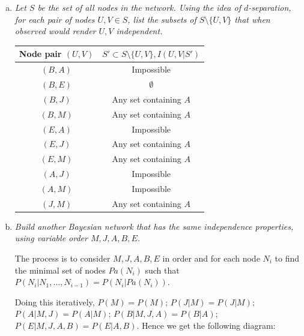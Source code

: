 \documentclass{article}
\begin{document}
\begin{enumerate}[(a)]
\item \textit{Let $S$ be the set of all nodes in the network. Using
  the idea of $d$-separation, for each pair of nodes $U,V\in S$, list
  the subsets of $S\setminus \{U,V\}$ that when observed would render
  $U,V$ independent.}

  \begin{tabular}{|c|c|}
  \hline
  Node pair $(U,V)$ & $S'\subset S\setminus \{U,V\},I(U,V|S')$ \\
  \hline
  $(B, A)$ & Impossible \\
  $(B, E)$ & $\emptyset$ \\
  $(B, J)$ & Any set containing $A$ \\
  $(B, M)$ & Any set containing $A$ \\
  $(E, A)$ & Impossible \\
  $(E, J)$ & Any set containing $A$ \\
  $(E, M)$ & Any set containing $A$ \\
  $(A, J)$ & Impossible \\
  $(A, M)$ & Impossible \\
  $(J, M)$ & Any set containing $A$ \\
  \hline
  \end{tabular}

\item \textit{Build another Bayesian network that has the same
  independence properties, using variable order $M,J,A,B,E$.}

  The process is to consider $M,J,A,B,E$ in order and for each node
  $N_i$ to find the minimal set of nodes $Pa(N_i)$ such that
  $P(N_i|N_1,\ldots,N_{i-1})=P(N_i|Pa(N_i))$.

  Doing this iteratively, $P(M)=P(M)$; $P(J|M)=P(J|M)$;
  $P(A|M,J)=P(A|M)$; $P(B|M,J,A)=P(B|A)$;
  $P(E|M,J,A,B)=P(E|A,B)$. Hence we get the following diagram:

  \begin{center}
\end{center}
\end{enumerate}
\end{document}
